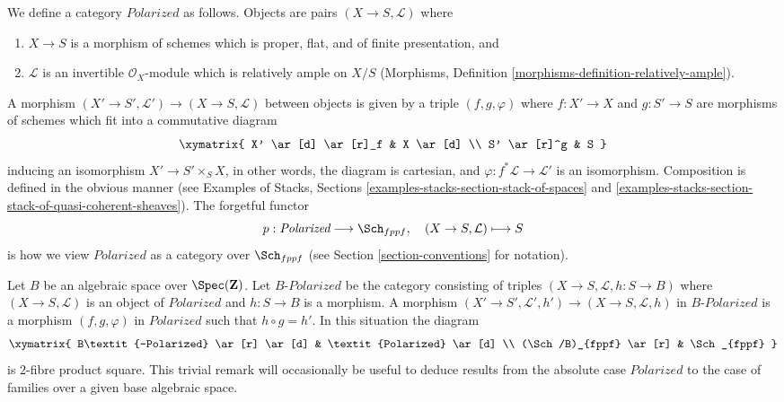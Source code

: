 \begin{situation}
\label{situation-polarized}
We define a category $\textit{Polarized}$ as follows. Objects are
pairs $(X \to S, \mathcal{L})$ where
\begin{enumerate}
\item $X \to S$ is a morphism of schemes which is proper, flat, and
of finite presentation, and
\item $\mathcal{L}$ is an invertible $\mathcal{O}_X$-module
which is relatively ample on $X/S$
(Morphisms, Definition \ref{morphisms-definition-relatively-ample}).
\end{enumerate}
A morphism $(X' \to S', \mathcal{L}') \to (X \to S, \mathcal{L})$
between objects
is given by a triple $(f, g, \varphi)$ where $f : X' \to X$ and $g : S' \to S$
are morphisms of schemes which fit into a commutative diagram
$$
\xymatrix{
X' \ar[d] \ar[r]_f & X \ar[d] \\
S' \ar[r]^g & S
}
$$
inducing an isomorphism $X' \to S' \times_S X$, in other words, the
diagram is cartesian,
and $\varphi : f^*\mathcal{L} \to \mathcal{L}'$ is an isomorphism.
Composition is defined in the obvious manner (see
Examples of Stacks, Sections
\ref{examples-stacks-section-stack-of-spaces} and
\ref{examples-stacks-section-stack-of-quasi-coherent-sheaves}).
The forgetful functor
$$
p : \textit{Polarized} \longrightarrow \Sch_{fppf},\quad
(X \to S, \mathcal{L}) \longmapsto S
$$
is how we view $\textit{Polarized}$ as a category over $\Sch_{fppf}$
(see Section \ref{section-conventions} for notation).
\end{situation}

\begin{remark}
\label{remark-polarized-base-change}
Let $B$ be an algebraic space over $\Spec(\mathbf{Z})$.
Let $B\textit{-Polarized}$ be the category consisting
of triples $(X \to S, \mathcal{L}, h : S \to B)$
where $(X \to S, \mathcal{L})$ is an object of
$\textit{Polarized}$ and $h : S \to B$ is a morphism.
A morphism $(X' \to S', \mathcal{L}', h') \to (X \to S, \mathcal{L}, h)$
in $B\textit{-Polarized}$ is a morphism $(f, g, \varphi)$
in $\textit{Polarized}$ such that $h \circ g = h'$.
In this situation the diagram
$$
\xymatrix{
B\textit{-Polarized} \ar[r] \ar[d] & \textit{Polarized} \ar[d] \\
(\Sch/B)_{fppf} \ar[r] & \Sch_{fppf}
}
$$
is $2$-fibre product square. This trivial remark
will occasionally be useful to deduce results from
the absolute case $\textit{Polarized}$ to the case
of families over a given base algebraic space.
\end{remark}














